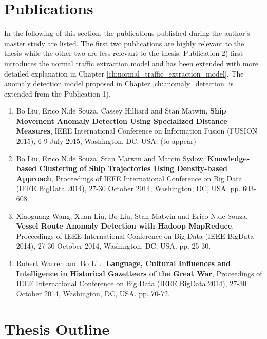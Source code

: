 \documentclass[12pt,glossary]{dalcsthesis}
\begin{document}
\section{Publications}

In the following of this section, the publications published during the author's master study are listed. The first two publications are highly relevant to the thesis while the other two are less relevant to the thesis. Publication 2) first introduces the normal traffic extraction model and has been extended with more detailed explanation in Chapter \ref{ch:normal_traffic_extraction_model}. The anomaly detection model proposed in Chapter \ref{ch:anomaly_detection} is extended from the Publication 1).

\begin{enumerate}[
labelindent=*,
style=multiline,
leftmargin=*,
label= \arabic*)
]

\item Bo Liu, Erico N.de Souza, Cassey Hilliard and Stan Matwin, \textbf{Ship Movement Anomaly Detection Using Specialized Distance Measures}, IEEE International Conference on Information Fusion (FUSION 2015), 6-9 July 2015, Washington, DC, USA. (to appear)


\item  Bo Liu, Erico N.de Souza, Stan Matwin and Marcin Sydow, \textbf{Knowledge-based Clustering of Ship Trajectories Using Density-based Approach}, Proceedings of IEEE International Conference on Big Data (IEEE BigData 2014), 27-30 October 2014, Washington, DC, USA. pp. 603-608.

\item  Xiaoguang Wang, Xuan Liu, Bo Liu, Stan Matwin and Erico N.de Souza, \textbf{Vessel Route Anomaly Detection with Hadoop MapReduce}, Proceedings of IEEE International Conference on Big Data (IEEE BigData 2014), 27-30 October 2014, Washington, DC, USA. pp. 25-30.

\item  Robert Warren and Bo Liu, \textbf{Language, Cultural Influences and Intelligence in Historical Gazetteers of the Great War}, Proceedings of IEEE International Conference on Big Data (IEEE BigData 2014), 27-30 October 2014, Washington, DC, USA.  pp. 70-72.


\end{enumerate}




\section{Thesis Outline}
\end{document}

